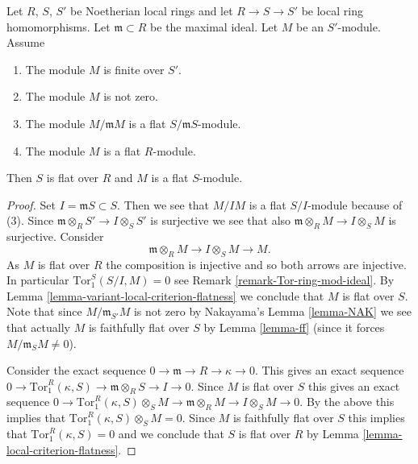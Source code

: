 \begin{lemma}
\label{lemma-criterion-flatness-fibre-Noetherian}
Let $R$, $S$, $S'$ be Noetherian local rings and let $R \to S \to S'$
be local ring homomorphisms. Let $\mathfrak m \subset R$ be the
maximal ideal. Let $M$ be an $S'$-module. Assume
\begin{enumerate}
\item The module $M$ is finite over $S'$.
\item The module $M$ is not zero.
\item The module $M/\mathfrak m M$
is a flat $S/\mathfrak m S$-module.
\item The module $M$ is a flat $R$-module.
\end{enumerate}
Then $S$ is flat over $R$ and $M$ is a flat $S$-module.
\end{lemma}

\begin{proof}
Set $I = \mathfrak mS \subset S$. Then we see that $M/IM$ is a flat
$S/I$-module because of (3). Since
$\mathfrak m \otimes_R S' \to I \otimes_S S'$ is surjective we see
that also $\mathfrak m \otimes_R M \to I \otimes_S M$ is surjective.
Consider
$$
\mathfrak m \otimes_R M \to I \otimes_S M \to M.
$$
As $M$ is flat over $R$ the composition is injective
and so both arrows are injective.
In particular $\text{Tor}_1^S(S/I, M) = 0$ see
Remark \ref{remark-Tor-ring-mod-ideal}. By
Lemma \ref{lemma-variant-local-criterion-flatness} we conclude
that $M$ is flat over $S$. Note that since $M/\mathfrak m_{S'}M$
is not zero by Nakayama's Lemma \ref{lemma-NAK}
we see that actually $M$ is faithfully flat over $S$ by
Lemma \ref{lemma-ff} (since it forces $M/\mathfrak m_SM \not = 0$).

\medskip\noindent
Consider the exact sequence
$0 \to \mathfrak m \to R \to \kappa \to 0$.
This gives an exact sequence
$0 \to \text{Tor}_1^R(\kappa, S) \to \mathfrak m \otimes_R S \to I \to 0$.
Since $M$ is flat over $S$ this gives an exact sequence
$0 \to \text{Tor}_1^R(\kappa, S)\otimes_S M \to
\mathfrak m \otimes_R M \to I \otimes_S M \to 0$.
By the above this implies that $\text{Tor}_1^R(\kappa, S)\otimes_S M = 0$.
Since $M$ is faithfully flat over $S$ this implies that
$\text{Tor}_1^R(\kappa, S) = 0$ and we conclude that
$S$ is flat over $R$ by Lemma \ref{lemma-local-criterion-flatness}.
\end{proof}

